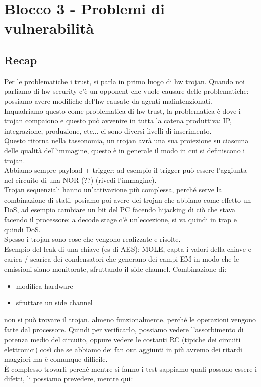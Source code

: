 \documentclass[oneside, 12pt]{extbook}
\begin{document}
\chapter{Blocco 3 - Problemi di vulnerabilità}

\section{Recap}
Per le problematiche i trust, si parla in primo luogo di hw trojan. Quando noi parliamo di hw security c'è un opponent che vuole causare delle problematiche: possiamo avere modifiche del'hw causate da agenti malintenzionati.\\Inquadriamo questo come problematica di hw trust, la problematica è dove i trojan compaiono e questo può avvenire in tutta la catena produttiva: IP, integrazione, produzione, etc... ci sono diversi livelli di inserimento.\\Questo ritorna nella tassonomia, un trojan avrà una sua proiezione su ciascuna delle qualità dell'immagine, questo è in generale il modo in cui si definiscono i trojan.\\Abbiamo sempre payload + trigger: ad esempio il trigger può essere l'aggiunta nel circuito di una NOR (??) (rivedi l'immagine).\\Trojan sequenziali hanno un'attivazione più complessa, perché serve la combinazione di stati, posiamo poi avere dei trojan che abbiano come effetto un DoS, ad esempio cambiare un bit del PC facendo hijacking di ciò che stava facendo il processore: a decode stage c'è un'eccezione, si va quindi in trap e quindi DoS.\\Spesso i trojan sono cose che vengono realizzate e risolte.\\Esempio del leak di una chiave (es di AES): MOLE, capta i valori della chiave e carica / scarica dei condensatori che generano dei campi EM in modo che le emissioni siano monitorate, sfruttando il side channel. Combinazione di:
\begin{itemize}
	\item modifica hardware
	\item sfruttare un side channel
\end{itemize}
non si può trovare il trojan, almeno funzionalmente, perché le operazioni vengono fatte dal processore. Quindi per verificarlo, possiamo vedere l'assorbimento di potenza medio del circuito, oppure vedere le costanti RC (tipiche dei circuiti elettronici) così che se abbiamo dei fan out aggiunti in più avremo dei ritardi maggiori ma è comunque difficile.\\È complesso trovarli perché mentre si fanno i test sappiamo quali possono essere i difetti, li possiamo prevedere, mentre qui:
\end{document}
